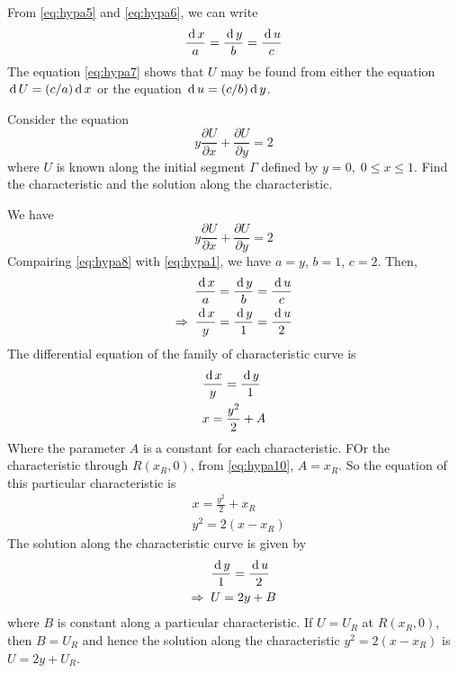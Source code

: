 \documentclass[../main-sheet.tex]{subfiles}
\begin{document}
From \eqref{eq:hypa5} and \eqref{eq:hypa6}, we can write
\begin{equation}
    \frac{\,\mathrm{d}\, x}{ a}=\frac{\,\mathrm{d}\, y}{b}=\frac{\,\mathrm{d}\, u}{c}\label{eq:hypa7}
\end{equation}
The equation \eqref{eq:hypa7} shows that \(U\) may be found from either the equation \(\,\mathrm{d}\, U=(c/a)\,\mathrm{d}\, x\) or the equation \(\,\mathrm{d}\, u=(c/b)\,\mathrm{d}\, y\).
\begin{ex}
    Consider the equation
    \[y\frac{\partial U}{\partial x}+\frac{\partial U}{\partial y}=2\]
    where \(U\) is known along the initial segment \(\Gamma\) defined by \(y=0,\;0\leq x\leq 1\). Find the characteristic and the solution along the characteristic.
\end{ex}
\begin{soln}
    We have
    \begin{equation}
        y\frac{\partial U}{\partial x}+\frac{\partial U}{\partial y}=2
        \label{eq:hypa8}
    \end{equation}
    Compairing \eqref{eq:hypa8} with \eqref{eq:hypa1}, we have \(a=y\), \(b=1\), \(c=2\). Then,
    \begin{align}
        &\frac{\,\mathrm{d}\, x}{ a}=\frac{\,\mathrm{d}\, y}{b}=\frac{\,\mathrm{d}\, u}{c}\notag\\
        \Rightarrow\;\;&\frac{\,\mathrm{d}\, x}{ y}=\frac{\,\mathrm{d}\, y}{1}=\frac{\,\mathrm{d}\, u}{2}\label{eq:hypa9}
    \end{align}
    The differential equation of the family of characteristic curve is 
    \begin{align}
        &\frac{\,\mathrm{d}\, x}{y}=\frac{\,\mathrm{d}\, y}{1}\notag\\
        &x=\frac{y^2}{2}+A\label{eq:hypa10}
    \end{align}
    Where the parameter \(A\) is a constant for each characteristic. FOr the characteristic through \(R(x_R,0)\), from \eqref{eq:hypa10}, \(A=x_R\). So the equation of this particular characteristic is
    \begin{align}
        &x=\frac{y^2}{2}+x_R\\
        &y^2=2(x-x_R)\label{eq:hypa11}
    \end{align}
    The solution along the characteristic curve is given by 
    \begin{align}
        &\frac{\,\mathrm{d}\, y}{1}=\frac{\,\mathrm{d}\, u}{2}\notag\\
        \Rightarrow\;\;&U=2y+B\label{eq:hypa12}
    \end{align}
    where \(B\) is constant along a particular characteristic. If \(U=U_R\) at \(R(x_R,0)\), then \(B=U_R\) and hence the solution along the characteristic \(y^2=2(x-x_R)\) is \(U=2y+U_R\).
\end{soln}
\end{document}
